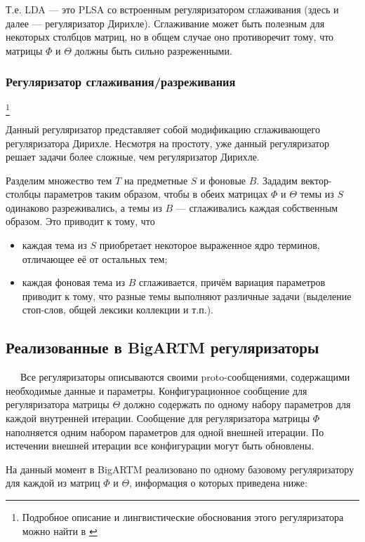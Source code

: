 Т.е. LDA --- это PLSA со встроенным регуляризатором сглаживания (здесь и далее --- регуляризатор Дирихле). Сглаживание может быть полезным для некоторых столбцов матриц, но в общем случае оно противоречит тому, что матрицы $\Phi$ и $\Theta$ должны быть сильно разреженными. 

\subsubsection{Регуляризатор сглаживания/разреживания}
\footnote{Подробное описание и лингвистические обоснования этого регуляризатора можно найти в \cite{voron_potap_14}}

 Данный регуляризатор представляет собой модификацию сглаживающего регуляризатора Дирихле. Несмотря на простоту, уже данный регуляризатор решает задачи более сложные, чем регуляризатор Дирихле.

Разделим множество тем $T$ на предметные $S$ и фоновые $B$. Зададим вектор-столбцы параметров таким образом, чтобы в обеих матрицах $\Phi$ и $\Theta$ темы из $S$ одинаково разреживались, а темы из $B$ --- сглаживались каждая собственным образом. Это приводит к тому, что 

\begin{itemize}
	\item каждая тема из $S$ приобретает некоторое выраженное ядро терминов, отличающее её от остальных тем;
	\item каждая фоновая тема из $B$ сглаживается, причём вариация параметров приводит к тому, что разные темы выполняют различные задачи (выделение стоп-слов, общей лексики коллекции и т.п.).
\end{itemize}  

\subsection{Реализованные в BigARTM регуляризаторы}

$\quad\;\:$Все регуляризаторы описываются своими proto-сообщениями, содержащими необходимые данные и параметры. Конфигурационное сообщение для регуляризатора матрицы $\Theta$ должно содержать по одному набору параметров для каждой внутренней итерации. Сообщение для регуляризатора матрицы $\Phi$ наполняется одним набором параметров для одной внешней итерации. По истечении внешней итерации все конфигурации могут быть обновлены.

На данный момент в BigARTM реализовано по одному базовому регуляризатору для каждой из матриц $\Phi$ и $\Theta$, информация о которых приведена ниже:

